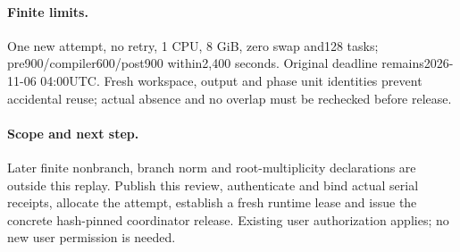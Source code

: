 \documentclass[10pt]{article}
\begin{document}
\paragraph{Finite limits.} One new attempt, no retry, 1 CPU, 8 GiB, zero swap and128 tasks; pre900/compiler600/post900 within2,400 seconds. Original deadline remains2026-11-06 04:00UTC. Fresh workspace, output and phase unit identities prevent accidental reuse; actual absence and no overlap must be rechecked before release.
\paragraph{Scope and next step.} Later finite nonbranch, branch norm and root-multiplicity declarations are outside this replay. Publish this review, authenticate and bind actual serial receipts, allocate the attempt, establish a fresh runtime lease and issue the concrete hash-pinned coordinator release. Existing user authorization applies; no new user permission is needed.
\end{document}
